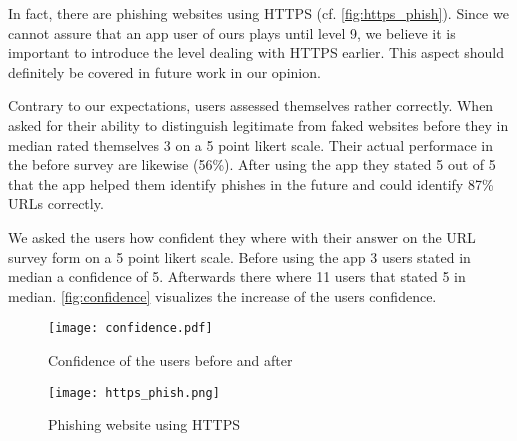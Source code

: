 \begin{description}[leftmargin=0cm]
	In fact, there are phishing websites using HTTPS (cf. \autoref{fig:https_phish}). 
	Since we cannot assure that an app user of ours plays until level 9, we believe it is important to introduce the level dealing with HTTPS earlier.
	This aspect should definitely be covered in future work in our opinion.
	\item[User Self-Assessment:] Contrary to our expectations, users assessed themselves rather correctly. When asked for their ability to distinguish legitimate from faked websites before they in median rated themselves 3 on a 5 point likert scale. Their actual performace in the before survey are likewise (56\%). After using the app they stated 5 out of 5 that the app helped them identify phishes in the future and could identify 87\% URLs correctly.
	\item[Confidence:] We asked the users how confident they where with their answer on the URL survey form on a 5 point likert scale. Before using the app 3 users stated in median a confidence of 5. Afterwards there where 11 users that stated 5 in median. \autoref{fig:confidence} visualizes the increase of the users confidence.
	\begin{figure}
		\centering
		\texttt{[image: confidence.pdf]}
		\caption{Confidence of the users before and after}
		\label{fig:confidence}
		\end{figure}
\end{description}
\begin{figure}
	\centering
	\texttt{[image: https\_phish.png]}
	\caption{Phishing website using HTTPS~\cite{phishtank}}
	\label{fig:https_phish}
	\end{figure}
	
